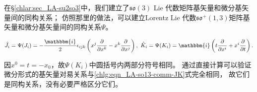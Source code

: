在\S\ref{chlar:sec_LA-su2so3}中，我们建立了$\mathfrak{so}(3)$ Lie 代数矩阵基矢量和微分基矢量间的同构关系；
仿照那里的做法，可以建立Lorentz Lie 代数$\mathfrak{so}^{+}(1,3)$矩阵基矢量和微分基矢量间的同构关系$\Psi$。
\begin{small}

\begin{equation}\label{chlg:eqn_LA-so13-JK-diff}
    \hat{J}_i=\Psi(J_i)= -\frac{\mathbbm{i}}{2}\epsilon_{ijk} \left(x^j\frac{\partial }{\partial x^k}
    - x^k\frac{\partial }{\partial x^j}\right), \ 
    \hat{K}_i=\Psi(K_i)= \mathbbm{i} \left(t\frac{\partial }{\partial x^i}+  x^i\frac{\partial }{\partial t}\right) .
\end{equation} 
\end{small}
因$x^0 = t=-x_0$，故$\Psi(K_i)$中圆括号内两部分符号相同。
通过直接计算可以验证微分形式的基矢量对易关系与\eqref{chlg:eqn_LA-so13-comm-JK}式完全相同，
故它们是同构关系，没有必要严格区分它们。




 


